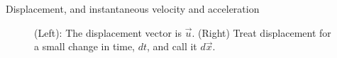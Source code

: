 \documentclass{beamer}
\begin{document}
\begin{frame}{Displacement, and instantaneous velocity and acceleration}
\begin{figure}
\centering
{}
\caption{\label{fig:displacement} (Left): The displacement vector is $\vec{u}$.  (Right) Treat displacement for a small change in time, $dt$, and call it $d\vec{x}$.}
\end{figure}
\end{frame}
\end{document}
